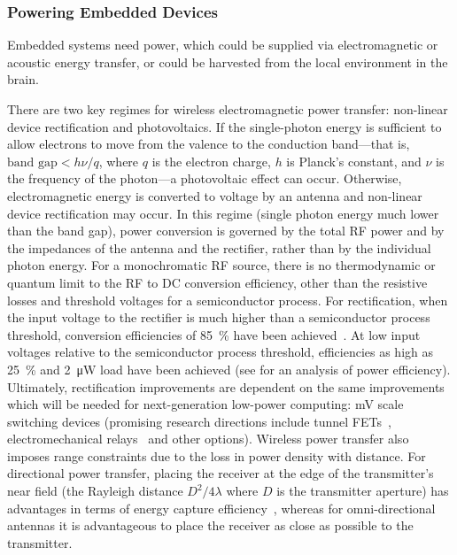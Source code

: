 \subsubsection{Powering Embedded Devices}

Embedded systems need power, which could be supplied via electromagnetic or acoustic energy transfer, or could be harvested from the local environment in the brain.

There are two key regimes for wireless electromagnetic power transfer: non-linear device rectification and photovoltaics.
If the single-photon energy is sufficient to allow electrons to move from the valence to the conduction band---that is, $\text{band gap} < h\nu/q$, where $q$ is the electron charge, $h$ is Planck's constant, and $\nu$ is the frequency of the photon---a photovoltaic effect can occur.
Otherwise, electromagnetic energy is converted to voltage by an antenna and non-linear device rectification may occur.
In this regime (single photon energy much lower than the band gap), power conversion is governed by the total RF power and by the impedances of the antenna and the rectifier, rather than by the individual photon energy.
For a monochromatic RF source, there is no thermodynamic or quantum limit to the RF to DC conversion efficiency, other than the resistive losses and threshold voltages for a semiconductor process.
For rectification, when the input voltage to the rectifier is much higher than a semiconductor process threshold, conversion efficiencies of \SI{85}{\percent} have been achieved~\cite{sun02}.
At low input voltages relative to the semiconductor process threshold, efficiencies as high as \SI{25}{\percent} and \SI{2}{\micro\watt} load have been achieved (see \cite{mandal07} for an analysis of power efficiency).
Ultimately, rectification improvements are dependent on the same improvements which will be needed for next-generation low-power computing: \si{\milli\volt} scale switching devices (promising research directions include tunnel FETs~\cite{ionescu11}, electromechanical relays~\cite{liu12} and other options).
Wireless power transfer also imposes range constraints due to the loss in power density with distance.
For directional power transfer, placing the receiver at the edge of the transmitter's near field (the Rayleigh distance $D^2/4\lambda$ where $D$ is the transmitter aperture) has advantages in terms of energy capture efficiency~\cite{ozeri10}, whereas for omni-directional antennas it is advantageous to place the receiver as close as possible to the transmitter.

